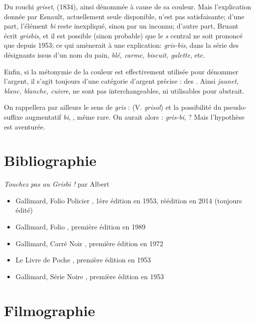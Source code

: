 Du rouchi \emph{griset},  (1834), ainsi dénommée à cause de sa couleur. Mais l'explication donnée par Esnault, actuellement seule disponible, n'est pas satisfaisante; d'une part, l'élément \emph{bi} reste inexpliqué, sinon par un  inconnu; d'autre part, Bruant écrit \emph{grisbis}, et il est possible (sinon probable) que le \emph{s} central ne soit prononcé que depuis 1953; ce qui amènerait à une explication: \emph{gris-bis}, dans la série des désignants issus d'un nom du pain, \emph{blé, carme, biscuit, galette}, etc.

Enfin, si la métonymie de la couleur est effectivement utilisée pour dénommer l'argent, il s'agit toujours d'une catégorie d'argent précise : des . Ainsi \emph{jaunet, blanc, blanche, cuivre}, ne sont pas interchangeables, ni utilisables pour  abstrait.

On rappellera par ailleurs le sens de \emph{gris} :  (V. \emph{grisol}) et la possibilité du pseudo-suffixe augmentatif \emph{bi}, , même rare. On aurait alors : \emph{gris-bi},  ? Mais l'hypothèse est aventurée.


\section{Bibliographie\label{preamble-biblio}}


\emph{Touchez pas au Grisbi !} par Albert 

\begin{itemize}
	\item Gallimard, Folio Policier , 1ère édition en 1953, réédition en 2014 (toujours édité)
	\item Gallimard, Folio , première édition en 1989
	\item Gallimard, Carré Noir , première édition en 1972
	\item Le Livre de Poche , première édition en 1953
	\item Gallimard, Série Noire , première édition en 1953
\end{itemize}


\section{Filmographie\label{preamble-filmography}}



